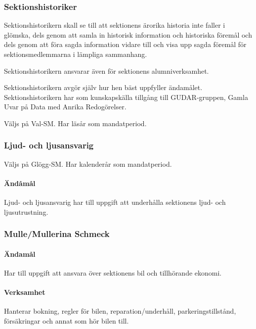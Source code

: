 \documentclass{dgovdoc}
\begin{document}
\subsubsection{Sektionshistoriker}

Sektionshistorikern skall se till att sektionens ärorika historia inte faller i glömska, dels genom att samla in historisk information och historiska föremål och dels genom att föra sagda information vidare till och visa upp sagda föremål för sektionsmedlemmarna i lämpliga sammanhang.

Sektionshistorikern ansvarar även för sektionens alumniverksamhet.

Sektionshistorikern avgör själv hur hen bäst uppfyller ändamålet. Sektionshistorikern har som
kunskapskälla tillgång till GUDAR-gruppen, Gamla Uvar på Data med Anrika Redogörelser.

Väljs på Val-SM. Har läsår som mandatperiod.

\subsubsection{Ljud- och ljusansvarig}

Väljs på Glögg-SM. Har kalenderår som mandatperiod.

\paragraph{Ändåmål}

Ljud- och ljusansvarig har till uppgift att underhålla sektionens ljud- och
ljusutrustning.

\subsubsection{Mulle/Mullerina Schmeck}

\paragraph{Ändamål}

Har till uppgift att ansvara över sektionens bil och tillhörande ekonomi.

\paragraph{Verksamhet}

Hanterar bokning, regler för bilen, reparation/underhåll, parkeringstillstånd,
försäkringar och annat som hör bilen till.
\end{document}
